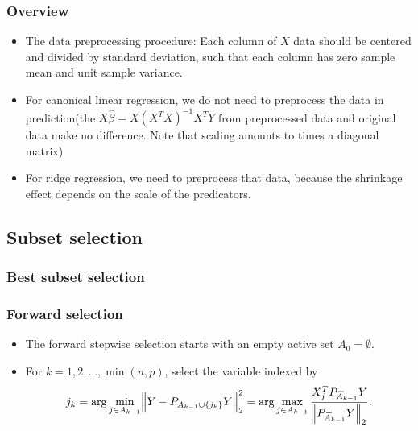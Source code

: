 \begin{refsection}
\subsubsection{Overview}

\begin{remark}\hfill
	\begin{itemize}
		\item The data preprocessing procedure:  Each column of $X$ data should be centered and divided by standard deviation, such that each column has zero sample mean and unit sample variance.
		\item For canonical linear regression, we do not need to preprocess the data in prediction(the $X\hat{\beta} = X(X^TX)^{-1} X^TY$ from preprocessed data and original data make no difference. Note that scaling amounts to times a diagonal matrix)
		\item For ridge regression, we need to preprocess that data, because the shrinkage effect depends on the scale of the predicators.  
		\end{itemize}
\end{remark}


\subsection{Subset selection}

\subsubsection{Best subset selection}




\begin{lemma}
	
\end{lemma}

\subsubsection{Forward selection}



\begin{method}
\begin{itemize}
	\item The forward stepwise selection starts with an empty active set $A_0 = \emptyset$.
	\item  For $k=1,2,...,\min(n,p)$, select the variable indexed by
	$$j_k = \arg\min_{j\in A_{k-1}} \norm{Y- P_{A_{k-1}\cup \{j_k\}}Y}_2^2 = \arg\max_{j\in A_{k-1}}\frac{X_j^TP^{\perp}_{A_{k-1}}Y}{\norm{P^{\perp}_{A_{k-1}}Y}_2}.$$
\end{itemize}	
	

\end{method}
\end{refsection}
